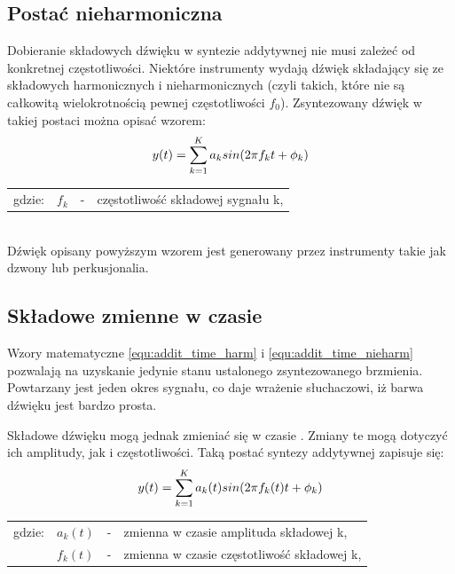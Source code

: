 \subsection{Postać nieharmoniczna} \label{pos_nieharm}
Dobieranie składowych dźwięku w syntezie addytywnej nie musi zależeć od konkretnej częstotliwości. Niektóre instrumenty wydają dźwięk składający się ze składowych harmonicznych i nieharmonicznych (czyli takich, które nie są całkowitą wielokrotnością pewnej częstotliwości $f_{0}$). Zsyntezowany dźwięk w takiej postaci można opisać wzorem:
\begin{equation} \label{equ:addit_time_nieharm}
y(t) = \sum_{k=1}^{K} a_{k}sin(2\pi f_{k}t + \phi_{k})  \\  
\end{equation}
\begin{tabular}{ l l l l}
	gdzie: 	&	$f_{k}$ & - &  częstotliwość składowej sygnału k,\\
\end{tabular} \\

Dźwięk opisany powyższym wzorem jest generowany przez instrumenty takie jak dzwony lub perkusjonalia.

\subsection{Składowe zmienne w czasie}
Wzory matematyczne \ref{equ:addit_time_harm} i \ref{equ:addit_time_nieharm} pozwalają na uzyskanie jedynie stanu ustalonego zsyntezowanego brzmienia. Powtarzany jest jeden okres sygnału, co daje wrażenie słuchaczowi, iż barwa dźwięku jest bardzo prosta.

Składowe dźwięku mogą jednak zmieniać się w czasie \cite{add_time_varying}. Zmiany te mogą dotyczyć ich amplitudy, jak i częstotliwości.
Taką postać syntezy addytywnej zapisuje się:
\begin{equation} \label{equ:addit_time_zmienne}
y(t) = \sum_{k=1}^{K} a_{k}(t)sin(2\pi f_{k}(t)t + \phi_{k})  \\  
\end{equation}
\begin{tabular}{ l l l l}
	gdzie: & $a_{k}(t)$ &  - & zmienna w czasie amplituda składowej k, \\
	&	$f_{k}(t)$ & - &  zmienna w czasie częstotliwość składowej k, \\
\end{tabular} \\

